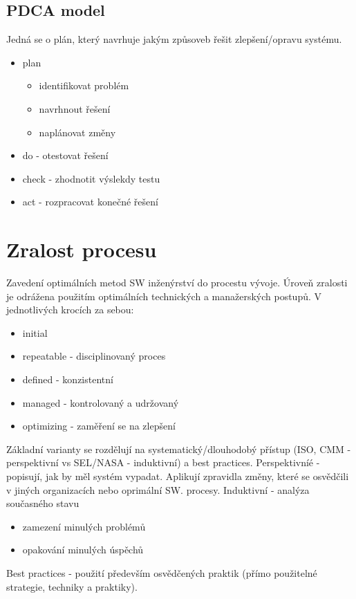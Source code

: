 \documentclass{szzclass}
\begin{document}
\subsection{PDCA model}
Jedná se o plán, který navrhuje jakým způsoveb řešit zlepšení/opravu systému.
\begin{itemize}
    \item plan
    \begin{itemize}
        \item identifikovat problém
        \item navrhnout řešení
        \item naplánovat změny
    \end{itemize}
    \item do - otestovat řešení
    \item check - zhodnotit výslekdy testu
    \item act - rozpracovat konečné řešení
\end{itemize}
\section{Zralost procesu}
Zavedení optimálních metod SW inženýrství do procestu vývoje. Úroveň zralosti je odrážena použitím optimálních technických a manažerských postupů.
V jednotlivých krocích za sebou:
\begin{itemize}
    \item initial
    \item repeatable - disciplinovaný proces
    \item defined - konzistentní
    \item managed - kontrolovaný a udržovaný
    \item optimizing - zaměření se na zlepšení
\end{itemize}
Základní varianty se rozdělují na systematický/dlouhodobý přístup (ISO, CMM - perspektivní vs SEL/NASA - induktivní) a best practices.
\newline
Perspektivníé - popisují, jak by měl systém vypadat. Aplikují zpravidla změny, které se osvědčili v jiných organizacích nebo oprimální SW. procesy.
\newline
Induktivní - analýza současného stavu
\begin{itemize}
    \item zamezení minulých problémů
    \item opakování minulých úspěchů
\end{itemize}
Best practices - použití především osvědčených praktik (přímo použitelné strategie, techniky a praktiky).
\end{document}
